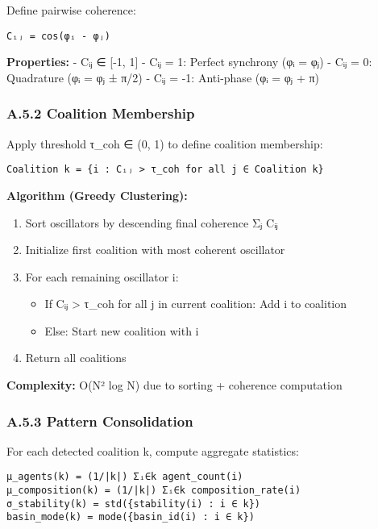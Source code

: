 \documentclass[
]{article}
\providecommand{\tightlist}{%
  \setlength{\itemsep}{0pt}\setlength{\parskip}{0pt}}
\begin{document}
Define pairwise coherence:

\begin{verbatim}
Cᵢⱼ = cos(φᵢ - φⱼ)
\end{verbatim}

\textbf{Properties:} - Cᵢⱼ ∈ {[}-1, 1{]} - Cᵢⱼ = 1: Perfect synchrony
(φᵢ = φⱼ) - Cᵢⱼ = 0: Quadrature (φᵢ = φⱼ ± π/2) - Cᵢⱼ = -1: Anti-phase
(φᵢ = φⱼ + π)

\subsubsection{A.5.2 Coalition
Membership}\label{a.5.2-coalition-membership}

Apply threshold τ\_coh ∈ (0, 1) to define coalition membership:

\begin{verbatim}
Coalition k = {i : Cᵢⱼ > τ_coh for all j ∈ Coalition k}
\end{verbatim}

\textbf{Algorithm (Greedy Clustering):}

\begin{enumerate}
\def\labelenumi{\arabic{enumi}.}
\tightlist
\item
  Sort oscillators by descending final coherence Σⱼ Cᵢⱼ
\item
  Initialize first coalition with most coherent oscillator
\item
  For each remaining oscillator i:

  \begin{itemize}
  \tightlist
  \item
    If Cᵢⱼ \textgreater{} τ\_coh for all j in current coalition: Add i
    to coalition
  \item
    Else: Start new coalition with i
  \end{itemize}
\item
  Return all coalitions
\end{enumerate}

\textbf{Complexity:} O(N² log N) due to sorting + coherence computation

\subsubsection{A.5.3 Pattern
Consolidation}\label{a.5.3-pattern-consolidation}

For each detected coalition k, compute aggregate statistics:

\begin{verbatim}
μ_agents(k) = (1/|k|) Σᵢ∈k agent_count(i)
μ_composition(k) = (1/|k|) Σᵢ∈k composition_rate(i)
σ_stability(k) = std({stability(i) : i ∈ k})
basin_mode(k) = mode({basin_id(i) : i ∈ k})
\end{verbatim}
\end{document}
